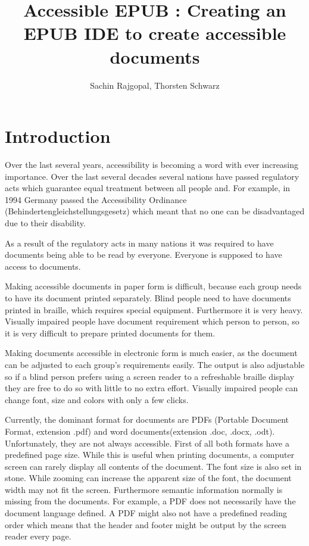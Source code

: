 \documentclass{article}
\title{Accessible EPUB : Creating an EPUB IDE to create accessible documents}
\author{Sachin Rajgopal, Thorsten Schwarz}
\date{}
\begin{document}
\maketitle

\section{Introduction}
Over the last several years, accessibility is becoming a word with ever increasing importance. Over the last several decades several nations have passed regulatory acts which guarantee equal treatment between all people and. For example, in 1994 Germany passed the Accessibility Ordinance (Behindertengleichstellungsgesetz) which meant that no one can be disadvantaged due to their disability.

As a result of the regulatory acts in many nations it was required to have documents being able to be read by everyone. Everyone is supposed to have access to documents.

Making accessible documents in paper form is difficult, because each group needs to have its document printed separately. Blind people need to have documents printed in braille, which requires special equipment. Furthermore it is very heavy. Visually impaired people have document requirement which person to person, so it is very difficult to prepare printed documents for them.

Making documents accessible in electronic form is much easier, as the document can be adjusted to each group's requirements easily. The output is also adjustable so if a blind person prefers using a screen reader to a refreshable braille display they are free to do so with little to no extra effort. Visually impaired people can change font, size and colors with only a few clicks.

Currently, the dominant format for documents are PDFs (Portable Document Format, extension .pdf) and word documents(extension .doc, .docx, .odt). Unfortunately, they are not always accessible. First of all both formats have a predefined page size. While this is useful when printing documents, a computer screen can rarely display all contents of the document. The font size is also set in stone. While zooming can increase the apparent size of the font, the document width may not fit the screen. Furthermore semantic information normally is missing from the documents. For example, a PDF does not necessarily have the document language defined. A PDF might also not have a predefined reading order which means that the header and footer might be output by the screen reader every page. 
\end{document}
